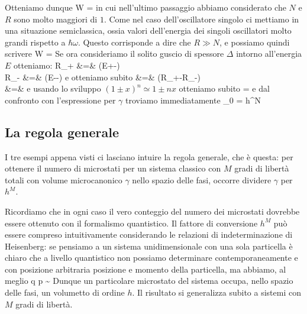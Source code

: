 Otteniamo dunque
\be
W =  \simeq {}
\ee
in cui nell'ultimo passaggio abbiamo considerato che $N$ e $R$ sono molto maggiori di $1$. Come nel caso dell'oscillatore singolo ci mettiamo in una situazione semiclassica, ossia valori dell'energia dei singoli oscillatori molto grandi rispetto a $\hbar\omega$. Questo corrisponde a dire che $R \gg N$, e possiamo quindi scrivere
\be
W =  \simeq {}
\ee
Se ora consideriamo il solito guscio di spessore $\Delta$ intorno all'energia $E$ otteniamo:
\bea
R_+ &=& \left(E+-\right)\nonumber\\
R_- &=& \left(E--\right)
\eea
e otteniamo subito
\bea
\Gamma &=& (R_+-R_-)\nonumber\\
       &=& 
\eea
e usando lo sviluppo $(1\pm x)^n\simeq 1\pm nx$ otteniamo subito
\be
\Gamma = 
\ee
e dal confronto con l'espressione per $\gamma$ troviamo immediatamente
\be
\gamma_0 = h^N
\ee

\subsection{La regola generale}

I tre esempi appena visti ci lasciano intuire la regola generale, che è questa: per ottenere il numero di microstati per un sistema classico con $M$ gradi di libertà totali con volume microcanonico $\gamma$ nello spazio delle fasi, occorre dividere $\gamma$ per $h^M$.

Ricordiamo che in ogni caso il vero conteggio del numero dei microstati dovrebbe essere ottenuto con il formalismo quantistico. Il fattore di conversione $h^M$ può essere compreso intuitivamente considerando le relazioni di indeterminazione di Heisenberg: se pensiamo a un sistema unidimensionale con una sola particella è chiaro che a livello quantistico non possiamo determinare contemporaneamente e con posizione arbitraria posizione e momento della particella, ma abbiamo, al meglio
\be
\delta q \delta p \sim \hbar
\ee
Dunque un particolare microstato del sistema occupa, nello spazio delle fasi, un volumetto di ordine $h$. Il risultato si generalizza subito a sistemi con $M$ gradi di libertà.

